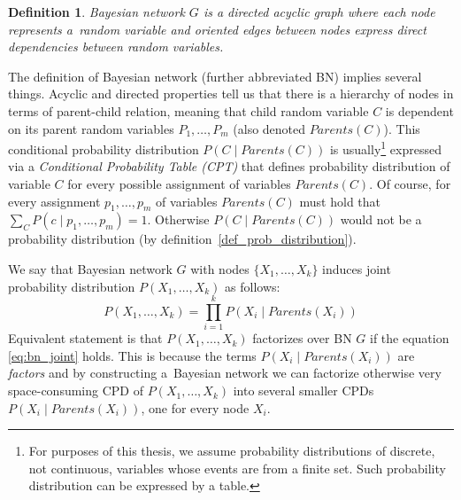 \documentclass[english,cover]{fitthesis} %
\newtheorem{math_def}{Definition}[chapter] %
\newcommand{\term}[1]{\emph{#1}}           %
\begin{document}
\begin{math_def}\label{def_bayesian_network}
    Bayesian network $G$ is a directed acyclic graph where each node represents a~random variable and oriented edges between nodes express direct dependencies between random variables.
\end{math_def}

The definition of Bayesian network (further abbreviated BN) implies several things. Acyclic and directed properties tell us that there is a hierarchy of nodes in terms of parent-child relation, meaning that child random variable $C$ is dependent on its parent random variables $P_1, \dots, P_m$ (also denoted $Parents(C)$). This conditional probability distribution $P(C \mid Parents(C))$ is usually\footnote{For purposes of this thesis, we assume probability distributions of discrete, not continuous, variables whose events are from a finite set. Such probability distribution can be expressed by a table.} expressed via a \term{Conditional Probability Table (CPT)} that defines probability distribution of variable $C$ for every possible assignment of variables $Parents(C)$. Of course, for every assignment $p_1,\dots,p_m$ of variables $Parents(C)$ must hold that $\sum_C P(c \mid p_1, \dots, p_m) = 1$. Otherwise $P(C \mid Parents(C))$ would not be a probability distribution (by definition~\ref{def_prob_distribution}).

We say that Bayesian network $G$ with nodes $\lbrace X_1, \dots, X_k\rbrace$ induces joint probability distribution $P(X_1, \dots, X_k)$ as follows:
\begin{equation}\label{eq:bn_joint}
    P(X_1, \dots, X_k) = \prod_{i=1}^k P(X_i \mid Parents(X_i))
\end{equation}
Equivalent statement is that $P(X_1, \dots, X_k)$ factorizes over BN $G$ if the equation \eqref{eq:bn_joint} holds. This is because the terms $P(X_i \mid Parents(X_i))$ are \term{factors} and by constructing a~Bayesian network we can factorize otherwise very space-consuming CPD of $P(X_1, \dots, X_k)$ into several smaller CPDs $P(X_i \mid Parents(X_i))$, one for every node $X_i$.
\end{document}
